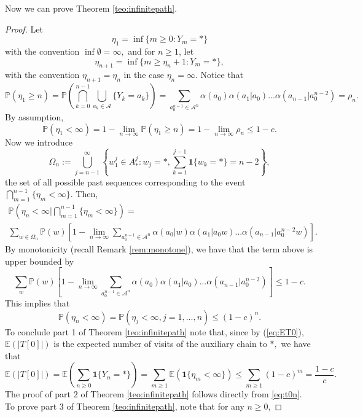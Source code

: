 \documentclass[a4paper]{article}
\def\P{{\mathbb P}}
\newcommand{\E}{\mathbb{E}}
\newcommand{\A}{\mathcal{A}}
\begin{document}
Now we can prove Theorem \ref{teo:infinitepath}.

\begin{proof}
Let
$$
\eta_1= \inf\{m\geq 0:Y_m=* \}
$$
with the convention $\inf \emptyset =\infty,$ and for $n\geq 1$, let
$$
\eta_{n+1}= \inf\{m\geq \eta_n+1:Y_m=*\},
$$
with the convention $\eta_{n+1}=\eta_{n}$ in the case $\eta_{n} =\infty$. Notice that 
\begin{equation}\label{eq:eta_1andrho}
\P ( \eta_1 \geq n ) =\P\left(\bigcap_{k=0}^{n-1}\bigcup_{a_k\in \A}\{Y_k=a_k\}\right) =  \sum_{a_{0}^{n-1}\in \A^n}\alpha(a_{0})\alpha(a_{1}|a_{0})\ldots \alpha(a_{n-1}|a_{0}^{n-2}) = \rho_n.
\end{equation}
By assumption, 
$$
\P(\eta_1 < \infty)=1- \lim_{n\to \infty}\P(\eta_1 \geq n) =1- \lim_{n\to \infty}\rho_n 
\leq 1-c.
$$
Now we introduce
$$ \Omega_n := \bigcup_{j=n-1}^{\infty}\left\{w_{1}^{j} \in  A_*^j: w_{j}=*, \sum_{k=1}^{j-1}\mathbf{1}\{w_k=*\}=n-2\right\} ,$$ 
the set of all possible past sequences corresponding to the event $\bigcap_{m=1}^{n-1}\{\eta_m<\infty\}.$ Then, 
\begin{multline*}
\P\left(\eta_n< \infty \Big|\bigcap_{m=1}^{n-1}\{\eta_m< \infty\}\right)=
\\
\sum_{w \in \Omega_n }\P(w)\left[ 1-\lim_{n\to \infty}\sum_{a_{0}^{n-1}\in \A^n}\alpha(a_{0}|w)\alpha(a_{1}|a_{0}w)\ldots \alpha(a_{n-1}|a_{0}^{n-2}w)\right].
\end{multline*}
By monotonicity (recall Remark \ref{rem:monotone}), we have that the term above is upper bounded by
$$
\sum_{w}\P(w)\left[1-\lim_{n\to \infty}\sum_{a_{0}^{n-1}\in \A^n}\alpha(a_{0})\alpha(a_{1}|a_{0})\ldots \alpha(a_{n-1}|a_{0}^{n-2})\right]\leq 1-c.
$$
This implies that
$$
\P(\eta_n < \infty)=\P(\eta_j < \infty,j=1,\ldots, n) \leq (1-c)^n.
$$
To conclude part 1 of Theorem \ref{teo:infinitepath} note that, since by (\ref{eq:ET0}),  $\E(|T[0]|)$ is the expected number of visits of the auxiliary chain to $ *,$ we have that 
$$
\E(|T[0]|)=\E\left(\sum_{n\geq 0} \mathbf{1}\{Y_n=*\}\right)=\sum_{m\geq 1 }\E\left( \mathbf{1}\{\eta_m < \infty \}\right) \le  \sum_{m\geq 1}(1-c)^m=\frac{1-c}{c}.
$$
The proof of part $2$ of Theorem \ref{teo:infinitepath} follows directly from \eqref{eq:t0n}.
To prove part $3$ of Theorem \ref{teo:infinitepath}, 
note that for any $n \geq 0$, %

\end{proof}
\end{document}
